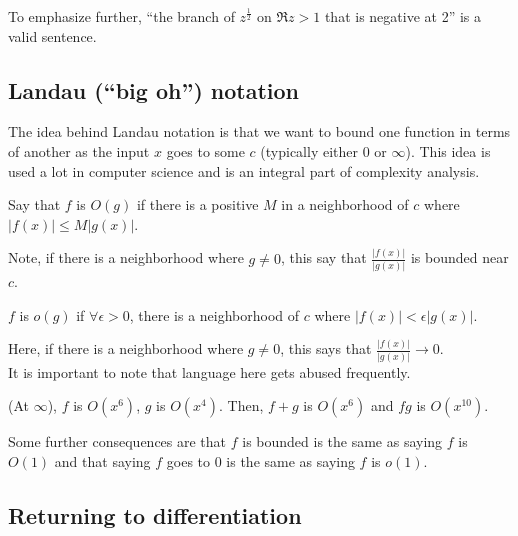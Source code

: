 \documentclass[11pt,leqno,oneside]{amsart}
\begin{document}
    To emphasize further, ``the branch of $z^\frac{1}{2}$ on $\Re z > 1$ that
    is negative at 2'' is a valid sentence.

    \subsection*{Landau (``big oh'') notation}
    The idea behind Landau notation is that we want to bound one function in
    terms of another as the input $x$ goes to some $c$ (typically either 0 or
    $\infty$). This idea is used a lot in computer science and is an integral
    part of complexity analysis.

    \begin{defn}
        Say that $f$ is $O(g)$ if there is a positive $M$ in a neighborhood of
        $c$ where $|f(x)| \leq M|g(x)|$.
    \end{defn}
    Note, if there is a neighborhood where $g \neq 0$, this say that
    $\frac{|f(x)|}{|g(x)|}$ is bounded near $c$.
    \begin{defn}
        $f$ is $o(g)$ if $\forall \epsilon > 0$, there is a neighborhood of $c$
        where $|f(x)| < \epsilon |g(x)|$.
    \end{defn}
    Here, if there is a neighborhood where $g \neq 0$, this says that
    $\frac{|f(x)|}{|g(x)|} \to 0$.\\

    It is important to note that language here gets abused frequently.

    \begin{example}
        (At $\infty$), $f$ is $O(x^6)$, $g$ is $O(x^4)$. Then, $f+g$ is
        $O(x^6)$ and $fg$ is $O(x^10)$.
    \end{example}

    Some further consequences are that $f$ is bounded is the same as saying $f$
    is $O(1)$ and that saying $f$ goes to 0 is the same as saying $f$ is
    $o(1)$.

    \subsection*{Returning to differentiation}
\end{document}
